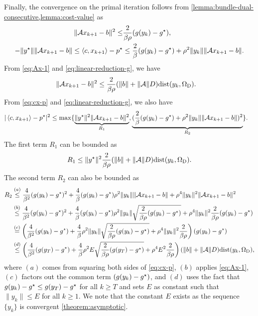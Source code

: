 \documentclass[11pt]{article}
\begin{document}
Finally, the convergence on the primal iteration follows from \cref{lemma:bundle-dual-consecutive,lemma:cost-value} as 
\begin{align}
     \| \mathcal{A} x_{k+1} - b\|^2  \leq &\frac{2}{\beta \rho } (g(y_{k}) - g^\star),  \label{eq:Ax-1}\\
 -\|y^\star\|\|\mathcal{A} x_{k+1} -  b\|   \leq \left \langle c, x_{k+1} \right\rangle - p^\star  &\leq  \frac{2}{\beta}(g(y_k)  -  g^\star)  + \rho^2 \|y_k\|  \|\mathcal{A} x_{k+1} - b\|. \label{eq:cx-p}
\end{align}
From \eqref{eq:Ax-1} and \eqref{eq:linear-reduction-g}, we have 
\begin{align*}
    \| \mathcal{A} x_{k+1} - b\|^2 &  \leq \frac{2}{\beta \rho }(\|b\| + \|\mathcal{A}\|D) \mathrm{dist}(y_k,\Omega_{\mathrm{D}}).
\end{align*}
From \eqref{eq:cx-p} and \eqref{eq:linear-reduction-g}, we also have 
\begin{align*}
    |\left \langle c, x_{k+1} \right\rangle - p^\star|^2 & \leq \max\{ \underbrace{\|y^\star\|^2 \| \mathcal{A} x_{k+1} - b\|^2}_{R_1},\underbrace{(\frac{2}{\beta}(g(y_k)  -  g^\star)  + \rho^2 \|y_k\|  \|\mathcal{A} x_{k+1} - b\|)^2}_{R_2} \}.
\end{align*}
The first term $R_1$ can be bounded as 
\begin{equation*}
    R_1 \leq \|y^\star\|^2 \frac{2}{\beta \rho }(\|b\| + \|\mathcal{A}\|D) \mathrm{dist}(y_k,\Omega_{\mathrm{D}}).
\end{equation*}
The second term $R_2$ can also be bounded as 
\begin{align*}
    R_2 & \overset{(a)}{\leq}  \frac{4}{\beta^2}(g(y_k)  -  g^\star)^2 + \frac{4}{\beta}(g(y_k)  -  g^\star) \rho^2 \|y_k\|  \|\mathcal{A} x_{k+1} - b\| + \rho^4 \|y_k\|^2  \|\mathcal{A} x_{k+1} - b\|^2 \\
    & \overset{(b)}{\leq}  \frac{4}{\beta^2}(g(y_k)  -  g^\star)^2 + \frac{4}{\beta}(g(y_k)  -  g^\star) \rho^2 \|y_k\|  \sqrt{\frac{2}{\beta \rho } (g(y_{k}) - g^\star)} + \rho^4 \|y_k\|^2  \frac{2}{\beta \rho } (g(y_{k}) - g^\star) \\
    & \overset{(c)}{=}  \left(\frac{4}{\beta^2}(g(y_k)  -  g^\star) + \frac{4}{\beta} \rho^2 \|y_k\|  \sqrt{\frac{2}{\beta \rho } (g(y_{k}) - g^\star)} + \rho^4 \|y_k\|^2  \frac{2}{\beta \rho }\right )  (g(y_{k}) - g^\star)\\
    & \overset{(d)}{\leq}  \left(\frac{4}{\beta^2}(g(y_T)  -  g^\star) + \frac{4}{\beta} \rho^2 E  \sqrt{\frac{2}{\beta \rho } (g(y_{T}) - g^\star)} + \rho^4 E^2  \frac{2}{\beta \rho }\right )  (\|b\| + \|\mathcal{A}\|D) \mathrm{dist}(y_k,\Omega_{\mathrm{D}}),
\end{align*}
where $(a)$ comes from squaring both sides of \eqref{eq:cx-p}, $(b)$ applies \eqref{eq:Ax-1}, $(c)$ factors out the common term $(g(y_{k}) - g^\star)$, and $(d)$ uses the fact that $g(y_{k}) - g^\star \leq g(y_{T}) - g^\star$ for all $k \geq T $ and sets $E$ as constant such that $\|y_k\| \leq E$ for all $k \geq 1$. We note that the constant $E$ exists as the sequence $\{y_k\}$ is convergent \cref{theorem:asymptotic}. 
\end{document}
